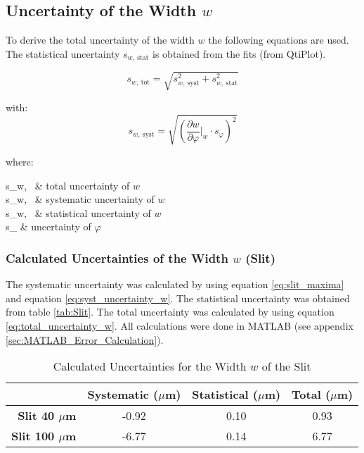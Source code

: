 \subsection{Uncertainty of the Width $w$}
\label{subsec:Uncertainty_Width}
To derive the total uncertainty of the width $w$ the following equations are used. The statistical uncertainty $s_{w,\ \text{stat}}$ is obtained from the fits (from QtiPlot).

\begin{equation}
s_{w,\ \text{tot}}=\sqrt{s_{w,\ \text{syst}}^2+s_{w,\ \text{stat}}^2}
\label{eq:total_uncertainty_w}
\end{equation}

with:
\begin{equation}
s_{w,\ \text{syst}}=\sqrt{\left(\frac{\partial w}{\partial \varphi}\Biggr|_{w}\cdot s_{\varphi}\right)^2}
\label{eq:syst_uncertainty_w}
\end{equation}

where:
\begin{conditions}
	s_{w,\ } & total uncertainty of $w$ \\
	s_{w,\ } & systematic uncertainty of $w$ \\
	s_{w,\ } & statistical uncertainty of $w$ \\
	s_{\varphi} & uncertainty of $\varphi$
\end{conditions}

\subsubsection{Calculated Uncertainties of the Width $w$ (Slit)}
\label{subsubsec:Uncertainty_Width_Slit}
The systematic uncertainty was calculated by using equation \ref{eq:slit_maxima} and equation \ref{eq:syst_uncertainty_w}. The statistical uncertainty was obtained from table \ref{tab:Slit}. The total uncertainty was calculated by using equation \ref{eq:total_uncertainty_w}. All calculations were done in MATLAB (see appendix \ref{sec:MATLAB_Error_Calculation}).

\begin{table}[H]
	\centering
	\renewcommand{\arraystretch}{1.3}
	\begin{tabular}{r||c|c|c}
		& \textbf{Systematic} ($\mu$m) & \textbf{Statistical} ($\mu$m) & \textbf{Total} ($\mu$m) \\
		\hline\hline
		\textbf{Slit 40 $\mu$m} & -0.92 & 0.10 & 0.93 \\
		\textbf{Slit 100 $\mu$m} & -6.77 & 0.14 & 6.77 \\
	\end{tabular}
	\caption{Calculated Uncertainties for the Width $w$ of the Slit}
	\label{tab:Calculated_Uncertainties_Width_Slit}
\end{table}

